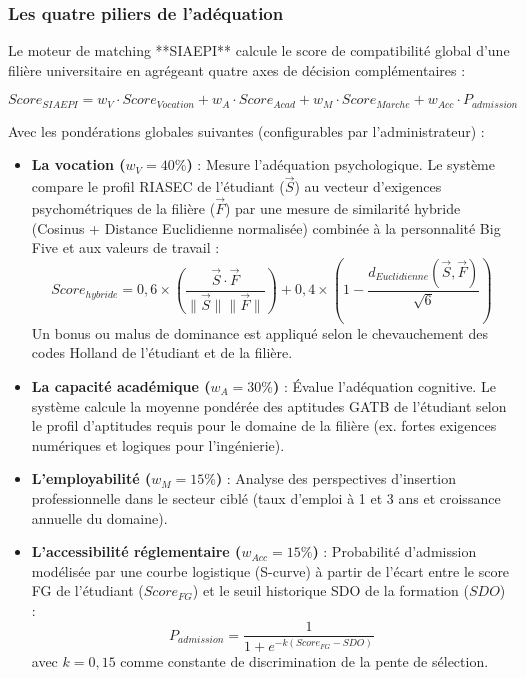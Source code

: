 \subsubsection{Les quatre piliers de l'adéquation}

Le moteur de matching **SIAEPI** calcule le score de compatibilité global d'une filière universitaire en agrégeant quatre axes de décision complémentaires :

\begin{equation}
Score_{SIAEPI} = w_V \cdot Score_{Vocation} + w_A \cdot Score_{Acad} + w_M \cdot Score_{Marche} + w_{Acc} \cdot P_{admission}
\label{eq:score_siaepi}
\end{equation}

Avec les pondérations globales suivantes (configurables par l'administrateur) :
\begin{itemize}
    \item \textbf{La vocation ($w_V = 40\%$)} : Mesure l'adéquation psychologique. Le système compare le profil RIASEC de l'étudiant ($\vec{S}$) au vecteur d'exigences psychométriques de la filière ($\vec{F}$) par une mesure de similarité hybride (Cosinus + Distance Euclidienne normalisée) combinée à la personnalité Big Five et aux valeurs de travail :
    \begin{equation}
    Score_{hybride} = 0{,}6 \times \left( \frac{\vec{S} \cdot \vec{F}}{\|\vec{S}\| \|\vec{F}\|} \right) + 0{,}4 \times \left( 1 - \frac{d_{Euclidienne}(\vec{S}, \vec{F})}{\sqrt{6}} \right)
    \label{eq:similarity}
    \end{equation}
    Un bonus ou malus de dominance est appliqué selon le chevauchement des codes Holland de l'étudiant et de la filière.
    \item \textbf{La capacité académique ($w_A = 30\%$)} : Évalue l'adéquation cognitive. Le système calcule la moyenne pondérée des aptitudes GATB de l'étudiant selon le profil d'aptitudes requis pour le domaine de la filière (ex. fortes exigences numériques et logiques pour l'ingénierie).
    \item \textbf{L'employabilité ($w_M = 15\%$)} : Analyse des perspectives d'insertion professionnelle dans le secteur ciblé (taux d'emploi à 1 et 3 ans et croissance annuelle du domaine).
    \item \textbf{L'accessibilité réglementaire ($w_{Acc} = 15\%$)} : Probabilité d'admission modélisée par une courbe logistique (S-curve) à partir de l'écart entre le score FG de l'étudiant ($Score_{FG}$) et le seuil historique SDO de la formation ($SDO$) :
    \begin{equation}
    P_{admission} = \frac{1}{1 + e^{-k(Score_{FG} - SDO)}}
    \label{eq:admission_prob}
    \end{equation}
    avec $k = 0{,}15$ comme constante de discrimination de la pente de sélection.
\end{itemize}

